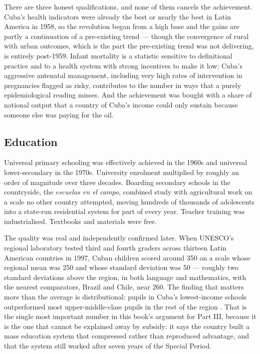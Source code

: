 There are three honest qualifications, and none of them cancels the
achievement. Cuba's health indicators were already the best or nearly the best
in Latin America in 1958, so the revolution began from a high base and the
gains are partly a continuation of a pre-existing trend --- though the
convergence of rural with urban outcomes, which is the part the pre-existing
trend was not delivering, is entirely post-1959. Infant mortality is a
statistic sensitive to definitional practice and to a health system with strong
incentives to make it low; Cuba's aggressive antenatal management, including
very high rates of intervention in pregnancies flagged as risky, contributes to
the number in ways that a purely epidemiological reading misses. And the
achievement was bought with a share of national output that a country of Cuba's
income could only sustain because someone else was paying for the oil.

\subsection{Education}

Universal primary schooling was effectively achieved in the 1960s and universal
lower-secondary in the 1970s. University enrolment multiplied by roughly an
order of magnitude over three decades. Boarding secondary schools in the
countryside, the \emph{escuelas en el campo}, combined study with agricultural
work on a scale no other country attempted, moving hundreds of thousands of
adolescents into a state-run residential system for part of every year. Teacher
training was industrialised. Textbooks and materials were free.

The quality was real and independently confirmed later. When UNESCO's regional
laboratory tested third and fourth graders across thirteen Latin American
countries in 1997, Cuban children scored around 350 on a scale whose regional
mean was 250 and whose standard deviation was 50 --- roughly two standard
deviations above the region, in both language and mathematics, with the nearest
comparators, Brazil and Chile, near 260. The finding that matters more than the
average is distributional: pupils in Cuba's lowest-income schools outperformed
most upper-middle-class pupils in the rest of the region
\citep{carnoy2007}. That is the single most important number in this book's
argument for Part III, because it is the one that cannot be explained away by
subsidy: it says the country built a mass education system that compressed
rather than reproduced advantage, and that the system still worked after seven
years of the Special Period.


